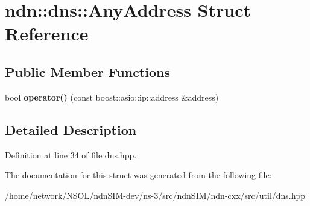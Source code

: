 \hypertarget{structndn_1_1dns_1_1AnyAddress}{}\section{ndn\+:\+:dns\+:\+:Any\+Address Struct Reference}
\label{structndn_1_1dns_1_1AnyAddress}
\subsection*{Public Member Functions}
\begin{DoxyCompactItemize}
\item 
bool {\bfseries operator()} (const boost\+::asio\+::ip\+::address \&address)\hypertarget{structndn_1_1dns_1_1AnyAddress_ac485065dd3f27e4b355180f7baa338df}{}\label{structndn_1_1dns_1_1AnyAddress_ac485065dd3f27e4b355180f7baa338df}

\end{DoxyCompactItemize}


\subsection{Detailed Description}


Definition at line 34 of file dns.\+hpp.



The documentation for this struct was generated from the following file\+:\begin{DoxyCompactItemize}
\item 
/home/network/\+N\+S\+O\+L/ndn\+S\+I\+M-\/dev/ns-\/3/src/ndn\+S\+I\+M/ndn-\/cxx/src/util/dns.\+hpp\end{DoxyCompactItemize}
